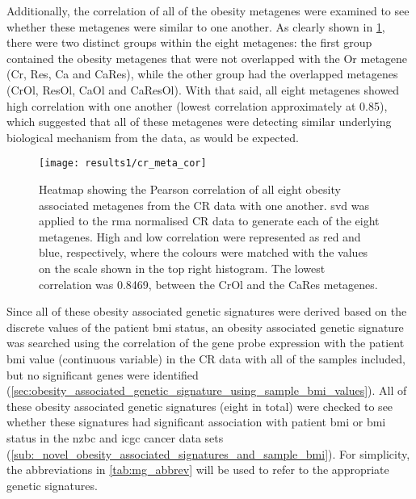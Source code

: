 Additionally, the correlation of all of the obesity metagenes were examined to see whether these metagenes were similar to one another.
As clearly shown in \cref{fig:cr_meta_cor}, there were two distinct groups within the eight metagenes: the first group contained the obesity metagenes that were not overlapped with the Or metagene (Cr, Res, Ca and CaRes), while the other group had the overlapped metagenes (CrOl, ResOl, CaOl and CaResOl).
With that said, all eight metagenes showed high correlation with one another (lowest correlation approximately at 0.85), which suggested that all of these metagenes were detecting similar underlying biological mechanism from the data, as would be expected.

\begin{figure}[htpb]
	\centering
	\texttt{[image: results1/cr\_meta\_cor]}
	\caption[Pearson correlation of all eight obesity metagenes identified in the CR data]{Heatmap showing the Pearson correlation of all eight obesity associated metagenes from the CR data with one another.
	\gls{svd} was applied to the \gls{rma} normalised CR data to generate each of the eight metagenes.
	High and low correlation were represented as red and blue, respectively, where the colours were matched with the values on the scale shown in the top right histogram.
	The lowest correlation was 0.8469, between the CrOl and the CaRes metagenes.
	}
	\label{fig:cr_meta_cor}
\end{figure}

Since all of these obesity associated genetic signatures were derived based on the discrete values of the patient \gls{bmi} status, an obesity associated genetic signature was searched using the correlation of the gene probe expression with the patient \gls{bmi} value (continuous variable) in the CR data with all of the samples included, but no significant genes were identified (\cref{sec:obesity_associated_genetic_signature_using_sample_bmi_values}).
All of these obesity associated genetic signatures (eight in total) were checked to see whether these signatures had significant association with patient \gls{bmi} or \gls{bmi} status in the \gls{nzbc} and \gls{icgc} cancer data sets (\cref{sub:_novel_obesity_associated_signatures_and_sample_bmi}).
For simplicity, the abbreviations in \cref{tab:mg_abbrev} will be used to refer to the appropriate genetic signatures.

